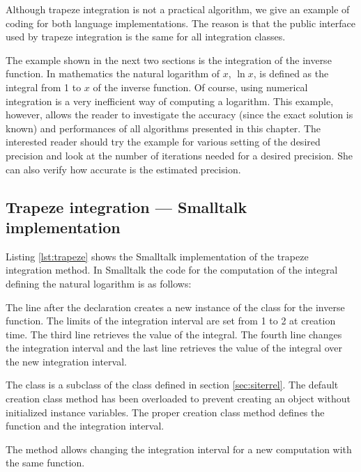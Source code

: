 Although trapeze integration is not a practical algorithm, we give
an example of coding for both language implementations. The reason
is that the public interface used by trapeze integration is the
same for all integration classes.

The example shown in the next two sections is the integration of
the inverse function. In mathematics the natural logarithm of $x$,
$\ln x$, is defined as the integral from 1 to $x$ of the inverse
function. Of course, using numerical integration is a very
inefficient way of computing a logarithm. This example, however,
allows the reader to investigate the accuracy (since the exact
solution is known) and performances of all algorithms presented in
this chapter. The interested reader should try the example for
various setting of the desired precision and look at the number of
iterations needed for a desired precision. She can also verify how
accurate is the estimated precision.

\subsection{Trapeze integration --- Smalltalk implementation}
\label{sec:strapeze}
Listing \ref{lst:trapeze} shows the Smalltalk implementation of the trapeze integration method. In Smalltalk the code for the computation of the integral defining the natural
logarithm is as follows:
\begin{displaycode}{Smalltalk}
| integrator ln2 ln3 |
integrator := PMTrapezeIntegrator function: [ :x | 1.0 / x ] from: 1 to: 2.}
ln2 := integrator evaluate.
integrator from: 1 to: 3.
ln3 := integrator evaluate.
\end{displaycode}
The line after the declaration creates a new instance of the class  for the inverse function. The limits of the integration interval are set from 1 to 2 at creation time. The
third line retrieves the value of the integral. The fourth line
changes the integration interval and the last line retrieves the
value of the integral over the new integration interval.

The class  is a subclass of the class
 defined in section
\ref{sec:siterrel}. The default creation class method 
has been overloaded to prevent creating an object without
initialized instance variables. The proper creation class method
defines the function and the integration interval.

The method  allows changing the integration interval
for a new computation with the same function.

